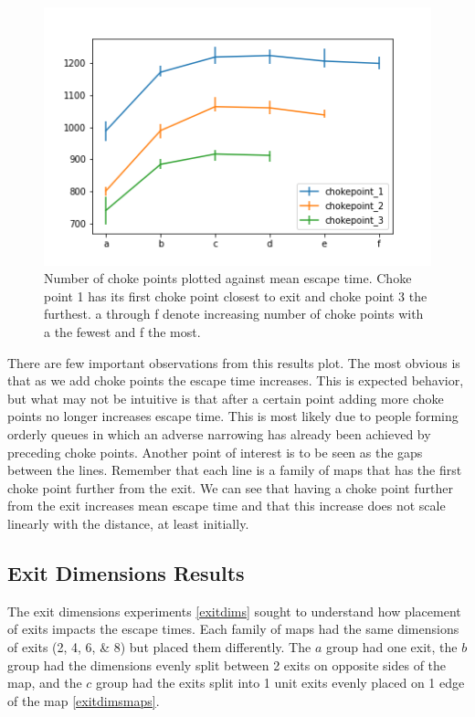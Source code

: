 \documentclass[12pt,letterpaper]{article}
\begin{document}
\begin{figure} [H]
  \centering
  \includegraphics[width=.9\linewidth]{./figures/chokepoint_graph.png}
  \caption{Number of choke points plotted against mean escape time. Choke point 1 has its first choke point closest to exit and choke point 3 the furthest.  a through f denote increasing number of choke points with a the fewest and f the most.}
  \label{fig:chokepointResults}
\end{figure}

There are few important observations from this results plot.  The most obvious is that as we add choke points the escape time increases.  This is expected behavior, but what may not be intuitive is that after a certain point adding more choke points no longer increases escape time.  This is most likely due to people forming orderly queues in which an adverse narrowing has already been achieved by preceding choke points. Another point of interest is to be seen as the gaps between the lines.  Remember that each line is a family of maps that has the first choke point further from the exit.  We can see that having a choke point further from the exit increases mean escape time and that this increase does not scale linearly with the distance, at least initially.  

\subsection{Exit Dimensions Results}

The exit dimensions experiments \ref{exitdims} sought to understand how placement of exits impacts the escape times.  Each family of maps had the same dimensions of exits (2, 4, 6, \& 8) but placed them differently.  The $a$ group had one exit, the $b$ group had the dimensions evenly split between 2 exits on opposite sides of the map, and the $c$ group had the exits split into 1 unit exits evenly placed on 1 edge of the map \ref{exitdimsmaps}.
\end{document}
